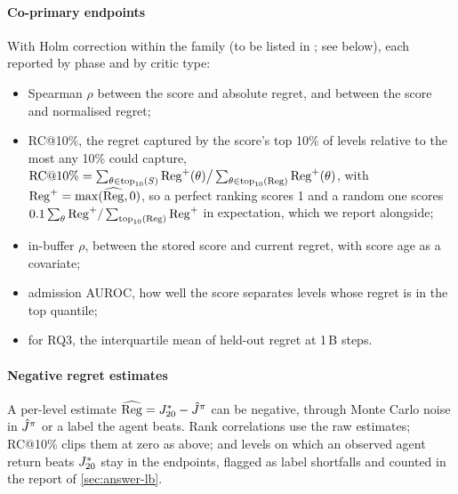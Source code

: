 \paragraph{Co-primary endpoints} With Holm correction within the family (to be listed in
; see below), each reported by phase and by critic type:
\begin{itemize}
  \item Spearman $\rho$ between the score and absolute regret, and between the score and
        normalised regret;
  \item RC@10\%, the regret captured by the score's top 10\% of levels relative to the
        most any 10\% could capture,
        $\mathrm{RC@10\%} = \sum_{\theta \in \mathrm{top}_{10}(S)} \mathrm{Reg}^{+}(\theta) \big/
        \sum_{\theta \in \mathrm{top}_{10}(\mathrm{Reg})} \mathrm{Reg}^{+}(\theta)$, with
        $\mathrm{Reg}^{+} = \max(\widehat{\mathrm{Reg}}, 0)$, so a perfect ranking scores 1 and a random
        one scores $0.1\sum_\theta \mathrm{Reg}^{+} / \sum_{\mathrm{top}_{10}(\mathrm{Reg})} \mathrm{Reg}^{+}$ in
        expectation, which we report alongside;
  \item in-buffer $\rho$, between the stored score and current regret, with score age as
        a covariate;
  \item admission AUROC, how well the score separates levels whose regret is in the top
        quantile;
  \item for RQ3, the interquartile mean of held-out regret at 1\,B steps.
\end{itemize}
\paragraph{Negative regret estimates} A per-level estimate $\widehat{\mathrm{Reg}} = J^{*}_{20} -
\hat{J}^{\pi}$ can be negative, through Monte Carlo noise in $\hat{J}^{\pi}$ or a label the agent beats.
Rank correlations use the raw estimates; RC@10\% clips them at zero as above; and levels
on which an observed agent return beats $J^{*}_{20}$ stay in the endpoints, flagged as label
shortfalls and counted in the report of \cref{sec:answer-lb}.

